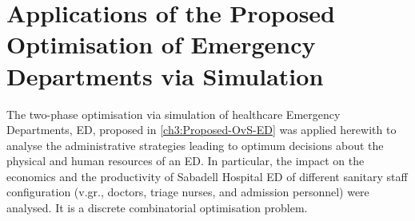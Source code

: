 \documentclass[11pt]{article} %
\begin{document}

\section{Applications of the Proposed Optimisation of Emergency Departments via Simulation}
\label{sec:app}


The two-phase optimisation via simulation of healthcare Emergency
Departments, ED, proposed in \ref{ch3:Proposed-OvS-ED} was applied
herewith to analyse the administrative strategies leading to optimum
decisions about the physical and human resources of an ED. In particular,
the impact on the economics and the productivity of Sabadell Hospital
ED of different sanitary staff configuration (v.gr., doctors, triage
nurses, and admission personnel) were analysed. It is a discrete combinatorial optimisation problem.
\end{document}
